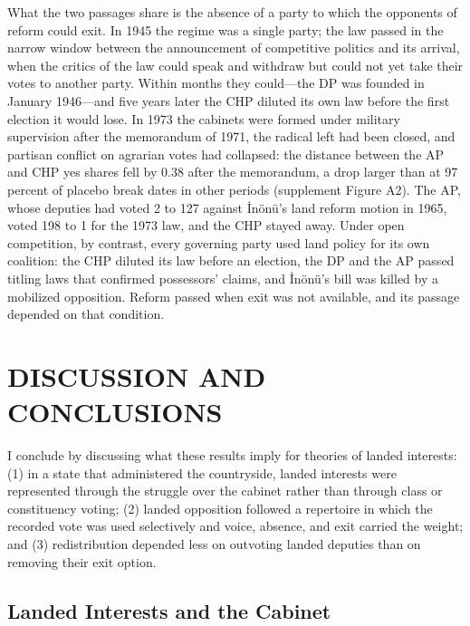 \documentclass[12pt]{article}
\begin{document}
What the two passages share is the absence of a party to which the opponents of reform could exit. In 1945 the regime was a single party; the law passed in the narrow window between the announcement of competitive politics and its arrival, when the critics of the law could speak and withdraw but could not yet take their votes to another party. Within months they could---the DP was founded in January 1946---and five years later the CHP diluted its own law before the first election it would lose. In 1973 the cabinets were formed under military supervision after the memorandum of 1971, the radical left had been closed, and partisan conflict on agrarian votes had collapsed: the distance between the AP and CHP yes shares fell by 0.38 after the memorandum, a drop larger than at 97 percent of placebo break dates in other periods (supplement Figure A2). The AP, whose deputies had voted 2 to 127 against İnönü's land reform motion in 1965, voted 198 to 1 for the 1973 law, and the CHP stayed away. Under open competition, by contrast, every governing party used land policy for its own coalition: the CHP diluted its law before an election, the DP and the AP passed titling laws that confirmed possessors' claims, and İnönü's bill was killed by a mobilized opposition. Reform passed when exit was not available, and its passage depended on that condition.

\section*{DISCUSSION AND CONCLUSIONS}

I conclude by discussing what these results imply for theories of landed interests: (1) in a state that administered the countryside, landed interests were represented through the struggle over the cabinet rather than through class or constituency voting; (2) landed opposition followed a repertoire in which the recorded vote was used selectively and voice, absence, and exit carried the weight; and (3) redistribution depended less on outvoting landed deputies than on removing their exit option.

\subsection*{Landed Interests and the Cabinet}
\end{document}
